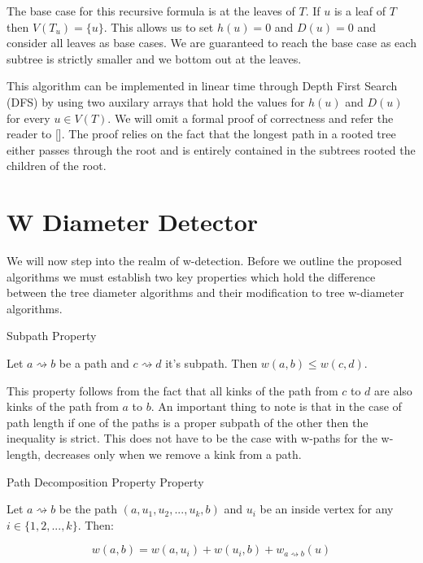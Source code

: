 The base case for this recursive formula is at the leaves of $T$. If $u$ is a leaf of $T$ then $V(T_u) = \{u\}$. This allows us to set $h(u) = 0$ and $D(u) = 0$ and consider all leaves as base cases. We are guaranteed to reach the base case as each subtree is strictly smaller and we bottom out at the leaves.

This algorithm can be implemented in linear time through Depth First Search (DFS) by using two auxilary arrays that hold the values for $h(u)$ and $D(u)$ for every $u \in V(T)$. We will omit a formal proof of correctness and refer the reader to []. The proof relies on the fact that the longest path in a rooted tree either passes through the root and is entirely contained in the subtrees rooted the children of the root.


\section{W Diameter Detector}

We will now step into the realm of w-detection. Before we outline the proposed algorithms we must establish two key properties which hold the difference between the tree diameter algorithms and their modification to tree w-diameter algorithms.

\begin{defn} Subpath Property  \end{defn}

Let $a \rightsquigarrow b$ be a path and $c \rightsquigarrow d$ it's subpath. Then $w(a, b) \le w(c, d)$. 

This property follows from the fact that all kinks of the path from $c$ to $d$ are also kinks of the path from $a$ to $b$. An important thing to note is that in the case of path length if one of the paths is a proper subpath of the other then the inequality is strict. This does not have to be the case with w-paths for the w-length, decreases only when we remove a kink from a path.

\begin{defn} Path Decomposition Property Property  \end{defn}

    Let $a \rightsquigarrow b$ be the path $(a, u_1, u_2, ..., u_k, b)$ and $u_i$ be an inside vertex for any $i \in \{1, 2, ..., k\}$. Then: 
    
    $$w(a, b) = w(a, u_i) + w(u_i, b) + w_{a \rightsquigarrow b}(u)$$
    
